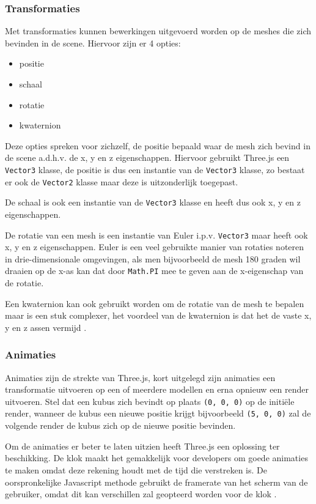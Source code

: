 \subsubsection{Transformaties}

Met transformaties kunnen bewerkingen uitgevoerd worden op de meshes die zich bevinden in de scene. Hiervoor zijn er 4 opties: 

\begin{itemize}
	\item positie
	\item schaal
	\item rotatie
	\item kwaternion
\end{itemize}

Deze opties spreken voor zichzelf, de positie bepaald waar de mesh zich bevind in de scene a.d.h.v. de x, y en z eigenschappen. Hiervoor gebruikt Three.js een \texttt{Vector3} klasse, de positie is dus een instantie van de \texttt{Vector3} klasse, zo bestaat er ook de \texttt{Vector2} klasse maar deze is uitzonderlijk toegepast.

De schaal is ook een instantie van de \texttt{Vector3} klasse en heeft dus ook x, y en z eigenschappen.

De rotatie van een mesh is een instantie van Euler i.p.v. \texttt{Vector3} maar heeft ook x, y en z eigenschappen. Euler is een veel gebruikte manier van rotaties noteren in drie-dimensionale omgevingen, als men bijvoorbeeld de mesh 180 graden wil draaien op de x-as kan dat door \texttt{Math.PI} mee te geven aan de x-eigenschap van de rotatie.

Een kwaternion kan ook gebruikt worden om de rotatie van de mesh te bepalen maar is een stuk complexer, het voordeel van de kwaternion is dat het de vaste x, y en z assen vermijd \autocite{Simon2023}.

\subsubsection{Animaties}

Animaties zijn de strekte van Three.js, kort uitgelegd zijn animaties een transformatie uitvoeren op een of meerdere modellen en erna opnieuw een render uitvoeren. Stel dat een kubus zich bevindt op plaats \texttt{(0, 0, 0)} op de initiële render, wanneer de kubus een nieuwe positie krijgt bijvoorbeeld \texttt{(5, 0, 0)} zal de volgende render de kubus zich op de nieuwe positie bevinden. 

Om de animaties er beter te laten uitzien heeft Three.js een oplossing ter beschikking. De klok maakt het gemakkelijk voor developers om goede animaties te maken omdat deze rekening houdt met de tijd die verstreken is. De oorspronkelijke Javascript methode gebruikt de framerate van het scherm van de gebruiker, omdat dit kan verschillen zal geopteerd worden voor de klok \autocite{Simon2023}.


